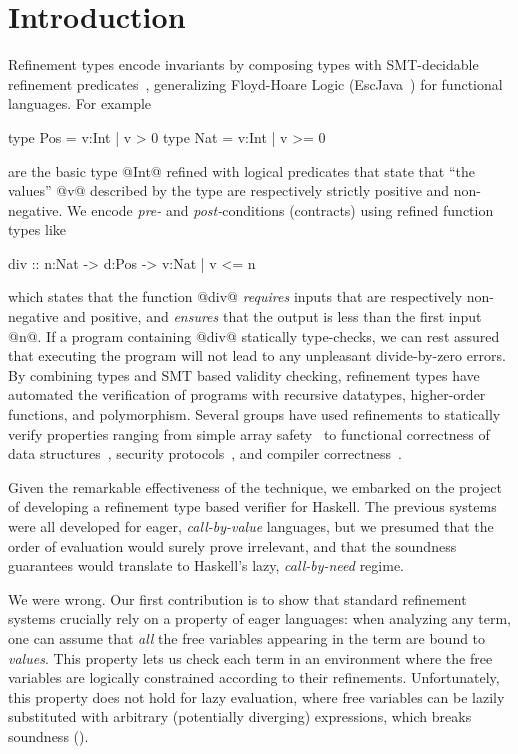 \section{Introduction}\label{sec:intro}

%
Refinement types encode invariants
by composing types with SMT-decidable refinement 
predicates~\cite{Rushby98,pfenningxi98},
generalizing Floyd-Hoare Logic 
(\eg EscJava~\cite{ESCJava})
for functional languages.
%
For example
%
\begin{code}
   type Pos = {v:Int | v >  0}
   type Nat = {v:Int | v >= 0}
\end{code}
%
are the basic type @Int@ refined with logical predicates 
that state that ``the values'' @v@ described by the type 
are respectively strictly positive and non-negative.
%
We encode \emph{pre-} and \emph{post-}conditions (contracts) using 
refined function types like 
%
\begin{code}
   div :: n:Nat -> d:Pos -> {v:Nat | v <= n}
\end{code}
%
which states that the function @div@ \emph{requires} inputs that are 
respectively non-negative and positive, and \emph{ensures} that the 
output is less than the first input @n@.
If a program containing @div@ statically type-checks, we can rest assured that
executing the program will not lead to any unpleasant divide-by-zero errors.
%
By combining types and SMT based validity checking,
refinement types have automated the verification of 
programs with recursive datatypes, higher-order 
functions, and polymorphism.
%
Several groups have used refinements to statically 
verify properties ranging from simple array safety~\cite{pfenningxi98,LiquidPLDI08}
to functional correctness of data structures~\cite{LiquidPLDI09}, 
security protocols~\cite{GordonTOPLAS2011},  
and compiler correctness~\cite{fstar}.

Given the remarkable effectiveness of the technique, 
we embarked on the project of developing a refinement 
type based verifier for  Haskell.
The previous systems were all developed for eager, 
\emph{call-by-value} languages, but we presumed that
the order of evaluation would surely prove irrelevant, 
and that the soundness guarantees would translate 
to Haskell's lazy, \emph{call-by-need} regime.

We were wrong.
%
Our first contribution is to show that standard refinement 
systems crucially rely on a property of eager languages:
%
when analyzing any term, one can assume that \emph{all} the
free variables appearing in the term are bound to \emph{values}.
This property lets us check each term in an environment where 
the free variables are logically constrained according to 
their refinements.
%
Unfortunately, this property does not hold for lazy evaluation, 
where free variables can be lazily substituted with arbitrary 
(potentially diverging) expressions, which breaks 
soundness ().

